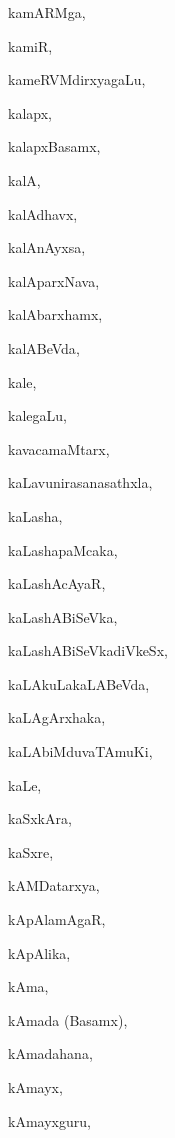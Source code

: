 \begin{multicols}{2}
{kamARMga}, \pageref{kamARMga}

{kamiR}, \pageref{kamiR}

{kameRVMdirxyagaLu}, \pageref{kameRVMdirxyagaLu}

{kalapx}, \pageref{kalapx}

{kalapxBasamx}, \pageref{kalapxBasamx}

{kalA}, \pageref{kalA}

{kalAdhavx}, \pageref{kalAdhavx}

{kalAnAyxsa}, \pageref{kalAnAyxsa}

{kalAparxNava}, \pageref{kalAparxNava}

{kalAbarxhamx}, \pageref{kalAbarxhamx}

{kalABeVda}, \pageref{kalABeVda}

{kale}, \pageref{kale}

{kalegaLu}, \pageref{kalegaLu}

{kavacamaMtarx}, \pageref{kavacamaMtarx}

{kaLavunirasanasathxla}, \pageref{kaLavunirasanasathxla}

{kaLasha}, \pageref{kaLasha}

{kaLashapaMcaka}, \pageref{kaLashapaMcaka}

{kaLashAcAyaR}, \pageref{kaLashAcAyaR}

{kaLashABiSeVka}, \pageref{kaLashABiSeVka}

{kaLashABiSeVkadiVkeSx}, \pageref{kaLashABiSeVkadiVkeSx}

{kaLAkuLakaLABeVda}, \pageref{kaLAkuLakaLABeVda}

{kaLAgArxhaka}, \pageref{kaLAgArxhaka}

{kaLAbiMduvaTAmuKi}, \pageref{kaLAbiMduvaTAmuKi}

{kaLe}, \pageref{kaLe}

{kaSxkAra}, \pageref{kaSxkAra}

{kaSxre}, \pageref{kaSxre}

{kAMDatarxya}, \pageref{kAMDatarxya}

{kApAlamAgaR}, \pageref{kApAlamAgaR}

{kApAlika}, \pageref{kApAlika}

{kAma}, \pageref{kAma}

{kAmada (Basamx)}, \pageref{kAmada (Basamx)}

{kAmadahana}, \pageref{kAmadahana}

{kAmayx}, \pageref{kAmayx}

{kAmayxguru}, \pageref{kAmayxguru}


\end{multicols}

